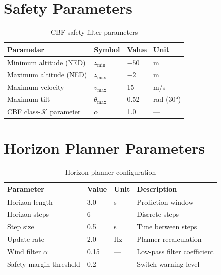 \section{Safety Parameters}

\begin{table}[htbp]
    \centering
    \caption{CBF safety filter parameters}
    \label{tab:cbf_params}
    \begin{tabular}{@{}llll@{}}
        \toprule
        \textbf{Parameter} & \textbf{Symbol} & \textbf{Value} & \textbf{Unit} \\
        \midrule
        Minimum altitude (NED) & $z_{\min}$ & $-50$ & m \\
        Maximum altitude (NED) & $z_{\max}$ & $-2$ & m \\
        Maximum velocity & $v_{\max}$ & 15 & m/s \\
        Maximum tilt & $\theta_{\max}$ & 0.52 & rad ($30°$) \\
        CBF class-$\mathcal{K}$ parameter & $\alpha$ & 1.0 & --- \\
        \bottomrule
    \end{tabular}
\end{table}

\section{Horizon Planner Parameters}

\begin{table}[htbp]
    \centering
    \caption{Horizon planner configuration}
    \label{tab:planner_params}
    \begin{tabular}{@{}llll@{}}
        \toprule
        \textbf{Parameter} & \textbf{Value} & \textbf{Unit} & \textbf{Description} \\
        \midrule
        Horizon length & 3.0 & s & Prediction window \\
        Horizon steps & 6 & --- & Discrete steps \\
        Step size & 0.5 & s & Time between steps \\
        Update rate & 2.0 & Hz & Planner recalculation \\
        Wind filter $\alpha$ & 0.15 & --- & Low-pass filter coefficient \\
        Safety margin threshold & 0.2 & --- & Switch warning level \\
        \bottomrule
    \end{tabular}
\end{table}

